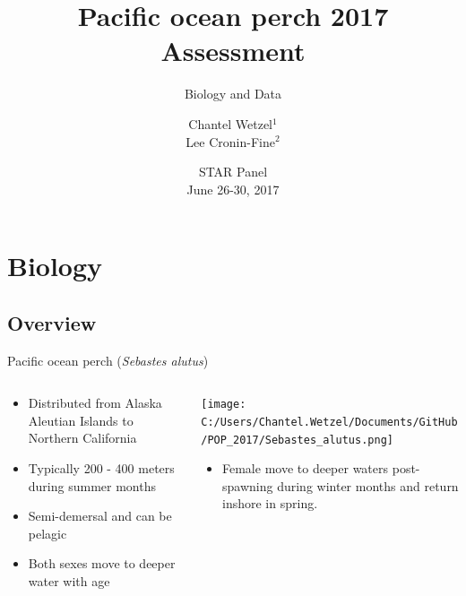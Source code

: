 \documentclass[pdf]{beamer}\usepackage[]{graphicx}\usepackage[]{color}
\title{Pacific ocean perch 2017 Assessment}
\subtitle{Biology and Data}
\author{Chantel Wetzel$^{1}$\\
        Lee Cronin-Fine$^{2}$}
\institute[NWFSC]{
Northwest Fisheries Science Center$^1$ \\
University of Washington$^2$ \\
\medskip
}
\date{{\footnotesize STAR Panel \\ June 26-30, 2017}}
\begin{document}
\begin{frame}
  \titlepage
\end{frame}

\section{Biology}

\subsection{Overview}
\begin{frame}{Pacific ocean perch (\textit{Sebastes alutus})}
\begin{columns}
  \begin{column}{0.5\textwidth}
      \begin{itemize}
        \item Distributed from  Alaska Aleutian Islands to Northern California
        \item Typically 200 - 400 meters during summer months
        \item Semi-demersal and can be pelagic
        \item Both sexes move to deeper water with age
      \end{itemize}
  \end{column}
  
  \begin{column}{0.5\textwidth}
    \texttt{[image: C:/Users/Chantel.Wetzel/Documents/GitHub/POP\_2017/Sebastes\_alutus.png]}
    \begin{itemize}
        \item Female move to deeper waters post-spawning during winter months and return inshore in spring.
      \end{itemize}
  \end{column}
\end{columns}
\end{frame}
\end{document}
